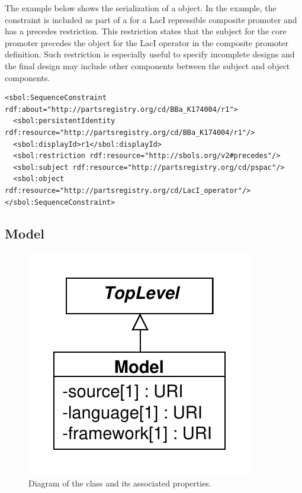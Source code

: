 The example below shows the serialization of a  object. In the example, the constraint is included as part of a  for a LacI repressible composite promoter and has a precedes restriction. This restriction states that the subject  for the core promoter precedes the object  for the LacI operator in the composite promoter definition. Such restriction is especially useful to specify incomplete designs and the final design may include other components between the subject and object components. 
\begin{lstlisting}
<sbol:SequenceConstraint rdf:about="http://partsregistry.org/cd/BBa_K174004/r1">
  <sbol:persistentIdentity rdf:resource="http://partsregistry.org/cd/BBa_K174004/r1"/>
  <sbol:displayId>r1</sbol:displayId>
  <sbol:restriction rdf:resource="http://sbols.org/v2#precedes"/>
  <sbol:subject rdf:resource="http://partsregistry.org/cd/pspac"/>
  <sbol:object rdf:resource="http://partsregistry.org/cd/LacI_operator"/>
</sbol:SequenceConstraint>
\end{lstlisting}


\subsection{Model}
\label{sec:Model}

\begin{figure}[ht]
\begin{center}
\includegraphics[scale=0.6]{uml/model}
\caption[]{Diagram of the  class and its associated properties.}
\label{uml:model}
\end{center}
\end{figure}

